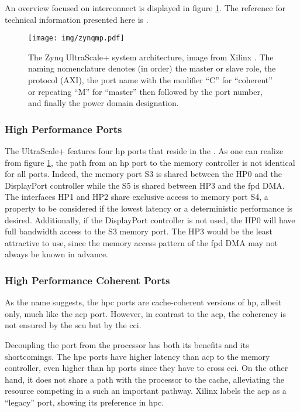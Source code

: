 An overview focused on interconnect
is displayed in figure \ref{fig:zynqmp-interconnect}. 
The reference for technical information presented here is \cite{ug1085}.

\begin{figure}[htbp]
  \centering
  \texttt{[image: img/zynqmp.pdf]}
  \caption{The Zynq UltraScale+ system architecture, image from Xilinx \cite{ug1085}.
  The naming nomenclature denotes (in order) the master or slave role, 
  the protocol (AXI), the port name with the modifier ``C'' for ``coherent'' or
  repeating ``M'' for ``master'' then followed by the port number, and finally
  the power domain designation.
  }
  \label{fig:zynqmp-interconnect}
\end{figure}


\subsubsection{High Performance Ports}
\label{sect:implementation}

The UltraScale+ features four \gls{hp} ports that reside in the .
As one can realize from figure \ref{fig:zynqmp-interconnect},
the path from an \gls{hp} port to the memory controller is not identical for all ports.
Indeed, the memory port S3 is shared between the HP0 and the DisplayPort controller
while the S5 is shared between HP3 and the \gls{fpd} DMA.
The interfaces HP1 and HP2 share exclusive access to memory port S4,
a property to be considered if the lowest latency 
or a deterministic performance is desired. Additionally, if the DisplayPort
controller is not used, the HP0 will have full bandwidth access to the S3 memory port.
The HP3 would be the least attractive to use, 
since the memory access pattern of the \gls{fpd}
DMA may not always be known in advance.

\subsubsection{High Performance Coherent Ports}

As the name suggests, the \gls{hpc} ports are cache-coherent versions of \gls{hp}, 
albeit  only, much like the \gls{acp} port. 
However, in contrast to the \gls{acp},
the coherency is not ensured by the \gls{scu} but by the \gls{cci}.

Decoupling the port from the processor has both its benefits and its shortcomings. 
The \gls{hpc} ports have higher latency than \gls{acp} to the memory controller,
even higher than \gls{hp} ports since they have to cross \gls{cci}.
On the other hand, it does not share a path with the processor to the cache,
alleviating the resource competing in a such an important pathway.
Xilinx labels the \gls{acp} as a ``legacy'' port, 
showing its preference in \gls{hpc}.

